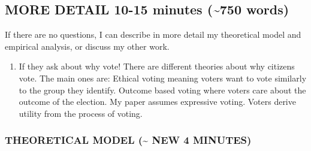 \documentclass[12pt]{article}
\theoremstyle{plain}
\theoremstyle{plain}
\theoremstyle{plain}
\theoremstyle{plain}
\theoremstyle{plain}
\theoremstyle{plain}
\begin{document}
\cleapage

\subsection{MORE DETAIL 10-15 minutes (\textasciitilde{}750 words)}
\label{sec:orgbdfca73}

If there are no questions, I can describe in more detail my theoretical model and empirical analysis, or discuss my other work.

\begin{enumerate}
\item If they ask about why vote!
\label{sec:org8afb9d8}
There are different theories about why citizens vote.
The main ones are:
Ethical voting meaning voters want to vote similarly to the group they identify.
Outcome based voting where voters care about the outcome of the election.
My paper assumes expressive voting. Voters derive utility from the process of voting.
\end{enumerate}


\subsubsection{THEORETICAL MODEL (\textasciitilde{} NEW 4 MINUTES)}
\label{sec:org010720c}
\end{document}
